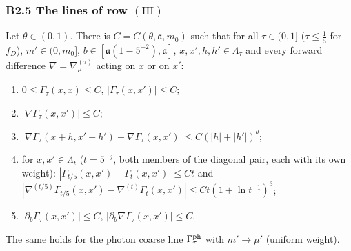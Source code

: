 
\subsubsection*{B2.5 The lines of row $(\mathrm{III})$}

\begin{lemma}\label{app:a04:lem:Gam}
Let $\theta\in(0,1)$. There is $C=C(\theta,\mathfrak a,m_0)$ such that for all $\tau\in(0,1]$ ($\tau\le\frac15$ for $f_D$), $m'\in(0,m_0]$, $b\in[\mathfrak a(1-5^{-2}),\mathfrak a]$, $x,x',h,h'\in\Lambda_\tau$ and every forward difference $\nabla=\nabla^{(\tau)}_\mu$ acting on $x$ or on $x'$:
\begin{enumerate}[label=\textup{(\ensuremath{\Gamma}\arabic*)},leftmargin=*]
\item $0\le\Gamma_\tau(x,x)\le C$, $|\Gamma_\tau(x,x')|\le C$;
\item $|\nabla\Gamma_\tau(x,x')|\le C$;
\item $|\nabla\Gamma_\tau(x+h,x'+h')-\nabla\Gamma_\tau(x,x')|\le C(|h|+|h'|)^\theta$;
\item for $x,x'\in\Lambda_t$ ($t=5^{-j}$, both members of the diagonal pair, each with its own weight): $|\Gamma_{t/5}(x,x')-\Gamma_t(x,x')|\le Ct$ and $|\nabla^{(t/5)}\Gamma_{t/5}(x,x')-\nabla^{(t)}\Gamma_t(x,x')|\le Ct(1+\ln t^{-1})^3$;
\item $|\partial_b\Gamma_\tau(x,x')|\le C$, $|\partial_b\nabla\Gamma_\tau(x,x')|\le C$.
\end{enumerate}
The same holds for the photon coarse line $\Gamma^{\mathrm{ph}}_\tau$ with $m'\to\mu'$ (uniform weight).
\end{lemma}
